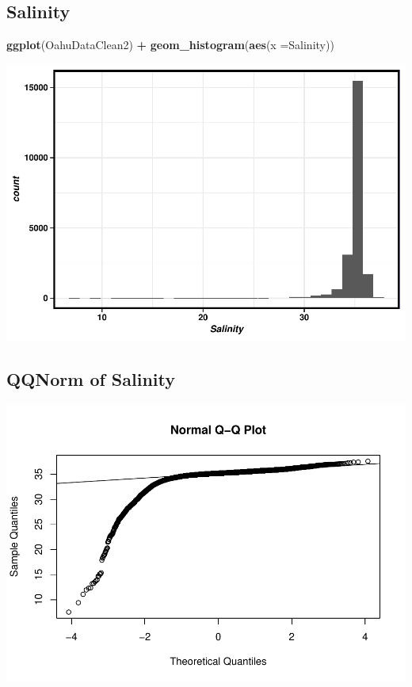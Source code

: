 \documentclass[12pt,]{article}
\newenvironment{Shaded}{\begin{snugshade}}{\end{snugshade}}
\newcommand{\KeywordTok}[1]{\textcolor[rgb]{0.13,0.29,0.53}{\textbf{#1}}}
\newcommand{\DataTypeTok}[1]{\textcolor[rgb]{0.13,0.29,0.53}{#1}}
\newcommand{\StringTok}[1]{\textcolor[rgb]{0.31,0.60,0.02}{#1}}
\newcommand{\OperatorTok}[1]{\textcolor[rgb]{0.81,0.36,0.00}{\textbf{#1}}}
\newcommand{\NormalTok}[1]{#1}
\begin{document}
\subsection{Salinity}\label{salinity}

\begin{Shaded}
\begin{Highlighting}[]
\KeywordTok{ggplot}\NormalTok{(OahuDataClean2) }\OperatorTok{+}
\StringTok{  }\KeywordTok{geom_histogram}\NormalTok{(}\KeywordTok{aes}\NormalTok{(}\DataTypeTok{x =}\NormalTok{Salinity))}
\end{Highlighting}
\end{Shaded}

\includegraphics{Garcia_ENV872_Project_files/figure-latex/unnamed-chunk-45-1.pdf}

\subsection{QQNorm of Salinity}\label{qqnorm-of-salinity}

\begin{Shaded}
\end{Shaded}

\includegraphics{Garcia_ENV872_Project_files/figure-latex/unnamed-chunk-46-1.pdf}
\end{document}
